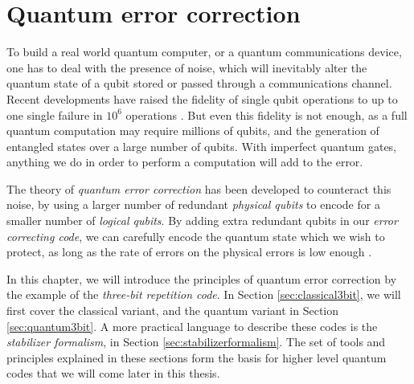 \chapter{Quantum error correction}

To build a real world quantum computer, or a quantum communications device, one has to deal with the presence of noise, which will inevitably alter the quantum state of a qubit stored or passed through a communications channel. Recent developments have raised the fidelity of single qubit operations to up to one single failure in $10^6$ operations \cite{ballance2016high}. But even this fidelity is not enough, as a full quantum computation may require millions of qubits, and the generation of entangled states over a large number of qubits. With imperfect quantum gates, anything we do in order to perform a computation will add to the error. 

The theory of \emph{quantum error correction} has been developed to counteract this noise, by using a larger number of redundant \emph{physical qubits} to encode for a smaller number of \emph{logical qubits}. By adding extra redundant qubits in our \emph{error correcting code}, we can carefully encode the quantum state which we wish to protect, as long as the rate of errors on the physical errors is low enough \cite{calderbank1996good, steane1996multiple, preskill1998reliable}.

In this chapter, we will introduce the principles of quantum error correction by the example of the \emph{three-bit repetition code}. In Section \ref{sec:classical3bit}, we will first cover the classical variant, and the quantum variant in Section \ref{sec:quantum3bit}. A more practical language to describe these codes is the \emph{stabilizer formalism}, in Section \ref{sec:stabilizerformalism}. The set of tools and principles explained in these sections form the basis for higher level quantum codes that we will come later in this thesis.

